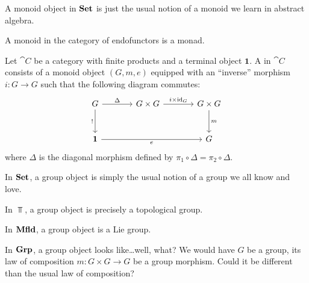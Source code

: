 \begin{node}
\begin{node}[Examples]
\begin{node}\label{internal-000L}%
A monoid object in $\mathbf{Set}$ is just the usual notion of a monoid we learn
in abstract algebra.
\end{node}

\begin{node}[Joke]\label{internal-000M}%
A monoid in the category of endofunctors is a monad.
\end{node}
\end{node}%

\begin{definition}\label{internal-0009}%
Let $\cat{C}$ be a category with finite products and a terminal object
$\mathbf{1}$. A  in $\cat{C}$ consists of a monoid
object $(G,m,e)$ equipped with an ``inverse'' morphism $i\colon G\to G$
such that the following diagram commutes:
\begin{equation*}
\begin{tikzcd}[sep=large]
G\ar[d,swap,"!"]\ar[r,"\Delta"] & G\times G\ar[r,"i\times\id_{G}"] & G\times G\ar[d,"m"]\\
\mathbf{1}\ar[rr,swap,"e"] & & G
\end{tikzcd}
\end{equation*}
where $\Delta$ is the diagonal morphism defined by
$\pi_{1}\circ\Delta=\pi_{2}\circ\Delta$.
\end{definition}

\begin{node}[Examples]\label{internal-000A}%

\begin{node}\label{internal-000B}%
In $\mathbf{Set}$, a group object is simply the usual notion of a group we all
know and love.
\end{node}

\begin{node}\label{internal-000C}%
In $\Top$, a group object is precisely a topological group.
\end{node}

\begin{node}\label{internal-000D}%
In $\mathbf{Mfld}$, a group object is a Lie group.
\end{node}

\begin{node}\label{internal-000E}%
In $\mathbf{Grp}$, a group object looks like\dots well, what? We would have $G$
be a group, its law of composition $m\colon G\times G\to G$ be a group
morphism. Could it be different than the usual law of composition? 


\end{node}
\end{node}
\end{node}
